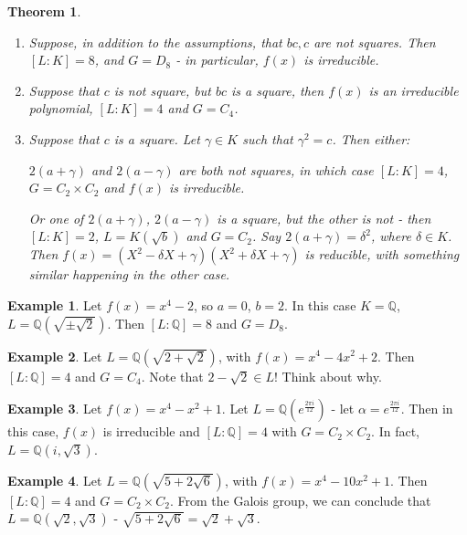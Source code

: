 \documentclass{article}
\theoremstyle{definition}
\newtheorem{exmp}{Example}[section]
\theoremstyle{plain}%
\newtheorem{thm}{Theorem}[section]
\theoremstyle{remark}
\newcommand{\Q}{\mathbb{Q}}
\begin{document}
\begin{thm}
\begin{enumerate}
    \item Suppose, in addition to the assumptions, that $bc, c$ are not squares. Then $[L : K] = 8$, and $G = D_8$ - in particular, $f(x)$ is irreducible.
    \item Suppose that $c$ is not square, but $bc$ is a square, then $f(x)$ is an irreducible polynomial, $[L : K] = 4$ and $G = C_4$.
    \item Suppose that $c$ is a square. Let $\gamma \in K$ such that $\gamma^2 = c$. Then either: 
    
    $2(a + \gamma)$ and $2(a - \gamma)$ are both not squares, in which case $[L : K] = 4$, $G = C_2 \times C_2$ and $f(x)$ is irreducible.
    
    Or one of $2(a + \gamma)$, $2(a - \gamma)$ is a square, but the other is not - then $[L : K] = 2$, $L = K(\sqrt{b})$ and $G=C_2$. Say $2(a + \gamma) = \delta^2$, where $\delta \in K$. Then $f(x) = (X^2 - \delta X + \gamma)(X^2 + \delta X + \gamma)$ is reducible, with something similar happening in the other case.
\end{enumerate}
\end{thm}

\begin{exmp}
    Let $f(x) = x^4 - 2$, so $a = 0$, $b = 2$. In this case $K = \Q$, $L = \Q(\sqrt{\pm \sqrt{2}})$. Then $[L : \Q] = 8$ and $G = D_8$.
\end{exmp}

\begin{exmp}
    Let $L = \Q(\sqrt{2 + \sqrt{2}})$, with $f(x) = x^4 - 4x^2 + 2$. Then $[L : \Q] = 4$ and $G = C_4$. Note that $2 - \sqrt{2} \in L$! Think about why.
\end{exmp}

\begin{exmp}
    Let $f(x) = x^4 -x^2 + 1$. Let $L = \Q(e^{\frac{2\pi i}{12}})$ - let $\alpha = e^{\frac{2\pi i}{12}}$. Then in this case, $f(x)$ is irreducible and $[L : \Q] = 4$ with $G = C_2 \times C_2$. In fact, $L = \Q(i, \sqrt{3})$.
\end{exmp}

\begin{exmp}
    Let $L = \Q(\sqrt{5 + 2\sqrt{6}})$, with $f(x) = x^4 -10x^2 + 1$. Then $[L : \Q] = 4$ and $G = C_2 \times C_2$. From the Galois group, we can conclude that $L = \Q(\sqrt{2}, \sqrt{3})$ - $\sqrt{5 + 2\sqrt{6}} = \sqrt{2} + \sqrt{3}$.
\end{exmp}
\end{document}

